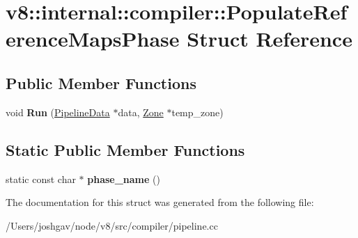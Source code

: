 \hypertarget{structv8_1_1internal_1_1compiler_1_1_populate_reference_maps_phase}{}\section{v8\+:\+:internal\+:\+:compiler\+:\+:Populate\+Reference\+Maps\+Phase Struct Reference}
\label{structv8_1_1internal_1_1compiler_1_1_populate_reference_maps_phase}
\subsection*{Public Member Functions}
\begin{DoxyCompactItemize}
\item 
void {\bfseries Run} (\hyperlink{classv8_1_1internal_1_1compiler_1_1_pipeline_data}{Pipeline\+Data} $\ast$data, \hyperlink{classv8_1_1internal_1_1_zone}{Zone} $\ast$temp\+\_\+zone)\hypertarget{structv8_1_1internal_1_1compiler_1_1_populate_reference_maps_phase_a6957782d774148850cd4081e779b931c}{}\label{structv8_1_1internal_1_1compiler_1_1_populate_reference_maps_phase_a6957782d774148850cd4081e779b931c}

\end{DoxyCompactItemize}
\subsection*{Static Public Member Functions}
\begin{DoxyCompactItemize}
\item 
static const char $\ast$ {\bfseries phase\+\_\+name} ()\hypertarget{structv8_1_1internal_1_1compiler_1_1_populate_reference_maps_phase_a4aa2557f21af3bd1553b95798cc72dd9}{}\label{structv8_1_1internal_1_1compiler_1_1_populate_reference_maps_phase_a4aa2557f21af3bd1553b95798cc72dd9}

\end{DoxyCompactItemize}


The documentation for this struct was generated from the following file\+:\begin{DoxyCompactItemize}
\item 
/\+Users/joshgav/node/v8/src/compiler/pipeline.\+cc\end{DoxyCompactItemize}
